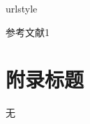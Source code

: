 \begin{thebibliography}{113}
	\providecommand{\natexlab}[1]{#1}
	\providecommand{\url}[1]{#1}
	\providecommand{\href}[2]{\url{#2}}
	\providecommand{\doi}[1]{DOI: \href{http://dx.doi.org/#1}{#1}}
	\expandafter\ifx\csname urlstyle\endcsname\relax\relax\else
	\fi
	\vbox{}
	\vbox{}

	参考文献1
		
\end{thebibliography}

\chapter[附录]{附录\quad 标题}\label{appendix}
\vbox{}
\vbox{}
无